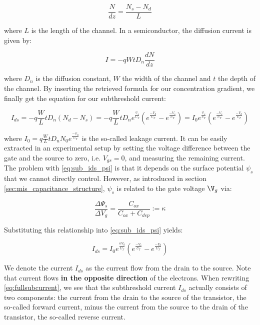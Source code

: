 \begin{equation}
    \frac{N}{dz} = \frac{N_s - N_d}{L}
\end{equation}

where $L$ is the length of the channel. In a semiconductor, the diffusion current is given by:

\begin{equation}
    I = -q W t D_n \frac{dN}{dz}
\end{equation}

where $D_n$ is the diffusion constant, $W$ the width of the channel and $t$ the depth of the channel. By inserting the retrieved formula for our concentration gradient, we finally get the equation for our subthreshold current:

\begin{equation}
    I_{ds} = -q \frac{W}{L} t D_n (N_d - N_s) = -q \frac{W}{L} t D_n e^{\frac{\psi_s}{U_T}} (e^{\frac{-V_d}{U_T}} - e^{\frac{-V_s}{U_T}}) = I_0 e^{\frac{\psi_s}{U_T}} (e^{\frac{-V_s}{U_T}} - e^{\frac{-V_d}{U_T}})\label{eq:sub_ids_psi}
\end{equation}

where $I_0 = q \frac{W}{L} t D_n N_0 e^{\frac{-\psi_0}{U_T}}$ is the so-called leakage current. It can be easily extracted in an experimental setup by setting the voltage difference between the gate and the source to zero, i.e. $V_{gs} = 0$, and measuring the remaining current. The problem with \eqref{eq:sub_ids_psi} is that it depends on the surface potential $\psi_s$ that we cannot directly control. However, as introduced in section \ref{sec:mis_capacitance_structure}, $\psi_s$ is related to the gate voltage $\V_g$ via:

\begin{equation}
\frac{\Delta \Psi_s}{\Delta V_g} = \frac{C_{ox}}{C_{ox} + C_{dep}} := \kappa
\end{equation}

Substituting this relationship into \eqref{eq:sub_ids_psi} yields:

\begin{equation}
    I_{ds} = I_0 e^{\frac{\kappa V_g}{U_T}}(e^{\frac{-V_s}{U_T}} - e^{\frac{-V_d}{U_T}}) \label{eq:fullsubcurrent}
\end{equation}

We denote the current $I_{ds}$ as the current flow from the drain to the source. Note that current flows \textbf{in the opposite direction} of the electrons. When rewriting \eqref{eq:fullsubcurrent}, we see that the subthreshold current $I_{ds}$ actually consists of two components: the current from the drain to the source of the transistor, the so-called forward current, minus the current from the source to the drain of the transistor, the so-called reverse current.

